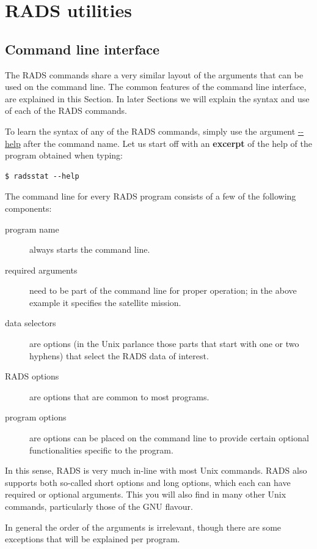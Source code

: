 \documentclass[a4paper,11pt,openany,natbib,nomargin]{thesis}
\makeatletter
\newcommand\lopt[1]{\url{--#1}\index{options, long!--#1@\protect\url{--#1}}}
\newcommand{\script}[2][tiny]{\begingroup\verbatimfont{\csname #1\endcsname}\endgroup}
\makeatother
\begin{document}
\chapter{RADS utilities}
\label{ch:utilities}

\section{Command line interface}
The RADS commands share a very similar layout of the arguments that can be used on the command line. The common features of the command line interface, are explained in this Section. In later Sections we will explain the syntax and use of each of the RADS commands.

To learn the syntax of any of the RADS commands, simply use the argument \lopt{help} after the command name. Let us start off with an \textbf{excerpt} of the help of the  program obtained when typing:
\begin{verbatim}
$ radsstat --help
\end{verbatim}
\script{sub/radsstat-h.out}

The command line for every RADS program consists of a few of the following components:
\begin{description}
\item[program name] always starts the command line.
\item[required arguments] need to be part of the command line for proper operation; in the above example it specifies the satellite mission.
\item[data selectors] are options (in the Unix parlance those parts that start with one or two hyphens) that select the RADS data of interest.
\item[RADS options] are options that are common to most programs.
\item[program options] are options can be placed on the command line to provide certain optional functionalities specific to the program.
\end{description}
In this sense, RADS is very much in-line with most Unix commands. RADS also supports both so-called short options and long options, which each can have required or optional arguments. This you will also find in many other Unix commands, particularly those of the GNU flavour.

In general the order of the arguments is irrelevant, though there are some exceptions that will be explained per program.
\end{document}
